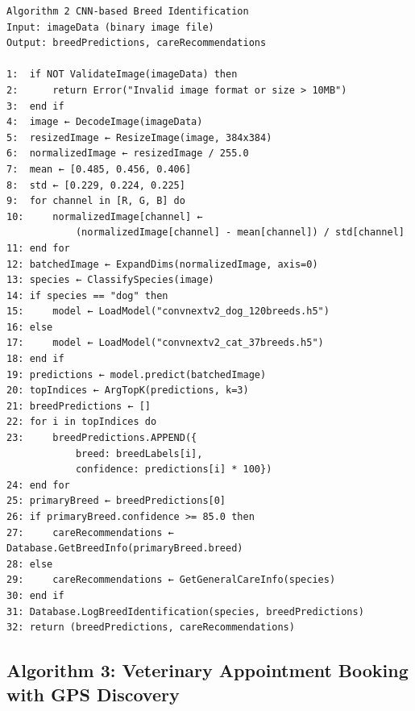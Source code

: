 \begin{verbatim}
Algorithm 2 CNN-based Breed Identification
Input: imageData (binary image file)
Output: breedPredictions, careRecommendations

1:  if NOT ValidateImage(imageData) then
2:      return Error("Invalid image format or size > 10MB")
3:  end if
4:  image ← DecodeImage(imageData)
5:  resizedImage ← ResizeImage(image, 384x384)
6:  normalizedImage ← resizedImage / 255.0
7:  mean ← [0.485, 0.456, 0.406]
8:  std ← [0.229, 0.224, 0.225]
9:  for channel in [R, G, B] do
10:     normalizedImage[channel] ← 
            (normalizedImage[channel] - mean[channel]) / std[channel]
11: end for
12: batchedImage ← ExpandDims(normalizedImage, axis=0)
13: species ← ClassifySpecies(image)
14: if species == "dog" then
15:     model ← LoadModel("convnextv2_dog_120breeds.h5")
16: else
17:     model ← LoadModel("convnextv2_cat_37breeds.h5")
18: end if
19: predictions ← model.predict(batchedImage)
20: topIndices ← ArgTopK(predictions, k=3)
21: breedPredictions ← []
22: for i in topIndices do
23:     breedPredictions.APPEND({
            breed: breedLabels[i],
            confidence: predictions[i] * 100})
24: end for
25: primaryBreed ← breedPredictions[0]
26: if primaryBreed.confidence >= 85.0 then
27:     careRecommendations ← Database.GetBreedInfo(primaryBreed.breed)
28: else
29:     careRecommendations ← GetGeneralCareInfo(species)
30: end if
31: Database.LogBreedIdentification(species, breedPredictions)
32: return (breedPredictions, careRecommendations)
\end{verbatim}

\subsection{Algorithm 3: Veterinary Appointment Booking with GPS Discovery}

